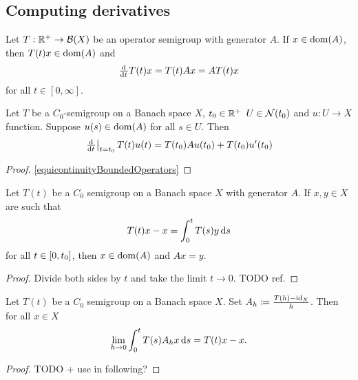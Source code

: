 \subsection{Computing derivatives}
\begin{lemma} \label{differentialOperatorSemigroupGenerator}
Let $T: \mathbb{R}^+\to \operatorname{\mathcal{B}}(X)$ be an operator semigroup with generator $A$. If $x\in\operatorname{dom}(A)$, then $T(t)x\in\operatorname{dom}(A)$ and
\[ \od{}{t}T(t)x = T(t)Ax = AT(t)x \]
for all $t\in [0,\infty]$.
\end{lemma}

\begin{lemma}
Let $T$ be a $C_0$-semigroup on a Banach space $X$, $t_0\in\mathbb{R}^+$ $U\in\operatorname{\mathcal{N}}(t_0)$ and $u: U \to X$ function. Suppose $u(s) \in \operatorname{dom}(A)$ for all $s\in U$. Then
\[ \left.\od{}{t}\right|_{t=t_0}T(t)u(t) = T(t_0)Au(t_0) + T(t_0)u'(t_0) \]
\end{lemma}
\begin{proof}
\ref{equicontinuityBoundedOperators}
\end{proof}

\begin{lemma} \label{domainGeneratorLemma}
Let $T(t)$ be a $C_0$ semigroup on a Banach space $X$ with generator $A$. If $x,y\in X$ are such that
\[ T(t)x-x = \int_0^tT(s)y\operatorname{d \!}{s} \]
for all $t\in\interval{0,t_0}$, then $x\in\operatorname{dom}(A)$ and $Ax = y$.
\end{lemma}
\begin{proof}
Divide both sides by $t$ and take the limit $t\to 0$. TODO ref.
\end{proof}

\begin{lemma} \label{convergenceGeneratorUnderIntegral}
Let $T(t)$ be a $C_0$ semigroup on a Banach space $X$. Set $A_h \coloneqq \frac{T(h) - \operatorname{id}_X}{h}$. Then for all $x\in X$
\[ \lim_{h\to 0}\int_0^t T(s)A_hx\operatorname{d \!}{s} = T(t)x-x. \]
\end{lemma}
\begin{proof}
TODO + use in following?
\end{proof}


